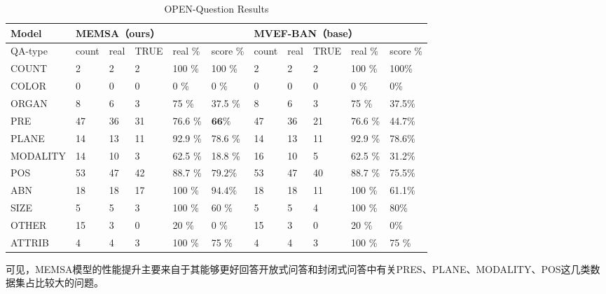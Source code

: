 \begin{table}
	\caption{\label{tab:qt-open-end}OPEN-Question Results}
	\centering
	\small %
	\begin{tabular}{l|lllll|lllll}
		\hline Model & \multicolumn{5}{|l}{\textbf{MEMSA（ours）}} & \multicolumn{5}{|l}{\textbf{MVEF-BAN}（base）} \\ 
		\hline QA-type & count & real & TRUE & real \% & score \% & count & real & TRUE & real \% & score \%\\
		\hline COUNT & 2 & 2 & 2 & 100 \%& 100 \%& 2 & 2 & 2 & 100 \%& 100\%\\
		COLOR & 0 & 0 & 0 & 0 \%& 0 \%& 0 & 0 & 0 & 0 \%& 0\%\ \\
		ORGAN & 8 & 6 & 3 & 75 \%& 37.5 \% & 8 & 6 & 3 & 75 \%& 37.5\%\\
		PRE & 47 & 36 & 31 & 76.6 \%& $\mathbf{66 \%}$ & 47 & 36 & 21 & 76.6 \%& 44.7\%\\
		PLANE & 14 & 13 & 11 & 92.9 \%& 78.6 \% & 14 & 13 & 11 & 92.9 \%& 78.6\%\\
		MODALITY & 14 & 10 & 3 & 62.5 \%& 18.8 \% & 16 & 10 & 5 & 62.5 \%& 31.2\%\\
		POS & 53 & 47 & 42 & 88.7 \%& $\mathbf{79.2 \%}$& 53 & 47 & 40 & 88.7 \%& 75.5\%\\
		ABN & 18 & 18 & 17 & 100 \%& $\mathbf{94.4 \%}$& 18 & 18 & 11 & 100 \%& 61.1\%\\
		SIZE & 5 & 5 & 3 & 100 \%& 60 \%& 5 & 5 & 4 & 100 \%& 80\%\\
		OTHER & 15 & 3 & 0 & 20 \%& 0 \%& 15 & 3 & 0 & 20 \%& 0\%\\
		ATTRIB &4 &4 &3 & 100 \%& 75 \%& 4 & 4 & 3 & 100 \%& 75 \% \\
		\hline
		\end{tabular}
\end{table}

可见，MEMSA模型的性能提升主要来自于其能够更好回答开放式问答和封闭式问答中有关PRES、PLANE、MODALITY、POS这几类数据集占比较大的问题。

